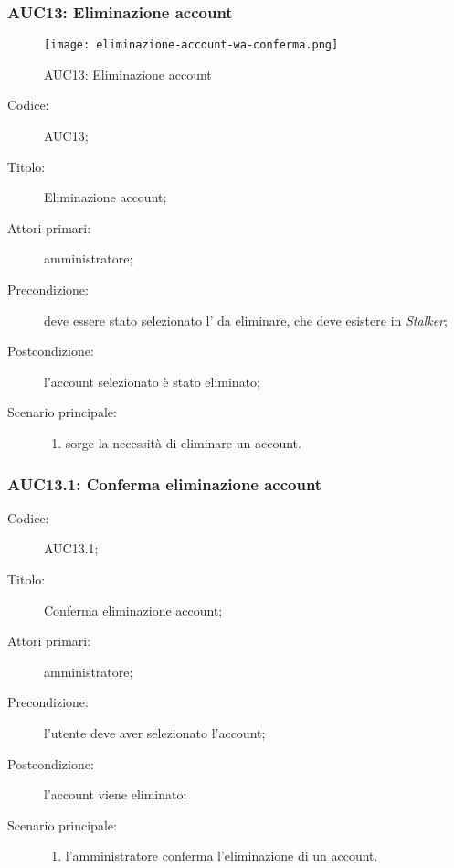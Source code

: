 \documentclass[../../../analisi-dei-requisiti.tex]{subfiles}
\begin{document}
\subsubsection{AUC13: Eliminazione account}%
\label{subs:AUC13}

\begin{figure}[H]
  \centering
  \texttt{[image: eliminazione-account-wa-conferma.png]}
  \caption{AUC13: Eliminazione account}%
  \label{fig:AUC13}
\end{figure}

\begin{description}
  \item[Codice:] AUC13;
  \item[Titolo:] Eliminazione account;
  \item[Attori primari:] amministratore;
  \item[Precondizione:] deve essere stato selezionato l' da eliminare, che deve esistere in \emph{Stalker};
  \item[Postcondizione:] l'account selezionato è stato eliminato;
  \item[Scenario principale:]
  \begin{enumerate}
    \item sorge la necessità di eliminare un account.
  \end{enumerate}
\end{description}

\subsubsection{AUC13.1: Conferma eliminazione account}%
\label{subs:AUC13.1}
\begin{description}
  \item[Codice:] AUC13.1;
  \item[Titolo:] Conferma eliminazione account;
  \item[Attori primari:] amministratore;
  \item[Precondizione:] l'utente deve aver selezionato l'account;
  \item[Postcondizione:] l'account viene eliminato;
  \item[Scenario principale:]
  \begin{enumerate}
    \item l'amministratore conferma l'eliminazione di un account.
  \end{enumerate}
\end{description}
\end{document}
